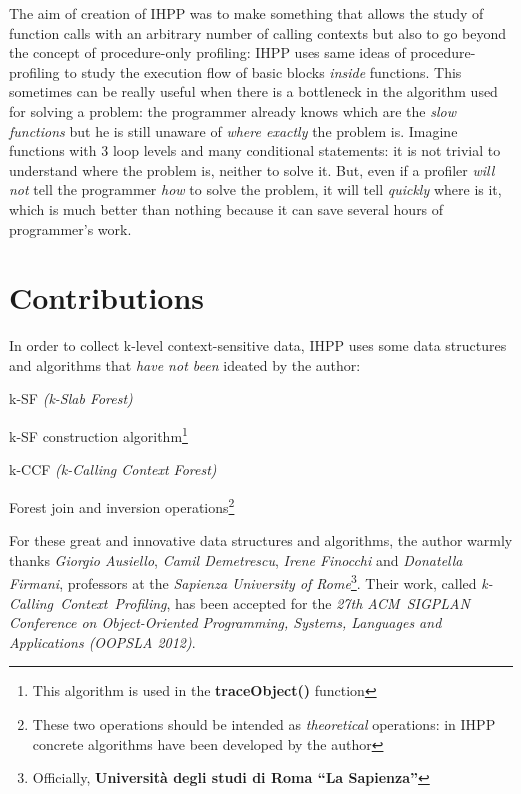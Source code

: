\documentclass[a4paper,11pt]{report}
\begin{document}
The aim of creation of IHPP was to make something that allows the study of
function calls with an arbitrary number of calling contexts but also to go
beyond the concept of procedure-only profiling: IHPP uses same ideas of
procedure-profiling to study the execution flow of basic blocks \emph{inside}
 functions. This sometimes can be really useful when there is a bottleneck in
the algorithm used for solving a problem: the programmer already knows which are
the \emph{slow functions} but he is still unaware of \emph{where exactly}
the problem is. Imagine functions with 3 loop levels and many conditional
statements: it is not trivial to understand where the problem is, neither to
solve it. But, even if a profiler \emph{will not} tell the programmer \emph{how}
to solve the problem, it will tell \emph{quickly} where is it, which is much
better than nothing because it can save several hours of programmer's work.

\section{Contributions}

In order to collect k-level context-sensitive data, IHPP uses some data
structures and algorithms that \emph{have not been} ideated by the author:

\begin{itemize*}
\item k-SF \emph{(k-Slab Forest)}
\item k-SF construction algorithm\footnote{This algorithm is used in the \textbf{traceObject()} function}
\item k-CCF \emph{(k-Calling Context Forest)}
\item Forest join and inversion operations\footnote{These two operations should
be intended as \emph{theoretical} operations: in IHPP concrete algorithms have been
developed by the author}
\end{itemize*}

For these great and innovative data structures and algorithms, the author warmly
thanks \emph{Giorgio Ausiello}, \emph{Camil Demetrescu}, \emph{Irene Finocchi}
and \emph{Donatella Firmani}, professors at the \emph{Sapienza University of
Rome}\footnote{Officially, \textbf{Universit\`a degli studi di Roma ``La
Sapienza''}}. Their work, called \emph{\mbox{k-Calling Context Profiling}}, has
been accepted for the \emph{27th \mbox{ACM SIGPLAN} Conference on
Object-Oriented Programming, Systems, Languages and Applications (OOPSLA 2012)}.
\end{document}
